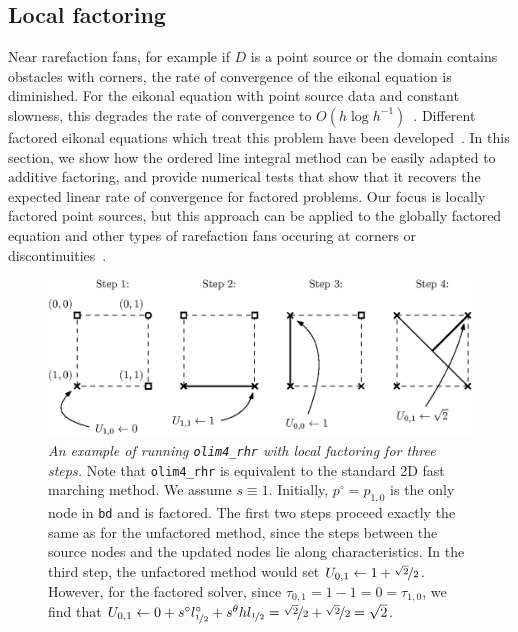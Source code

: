 \documentclass[smallcondensed]{svjour3}
\begin{document}
\subsection{Local factoring}

Near rarefaction fans, for example if $D$ is a point source or the
domain contains obstacles with corners, the rate of convergence of the
eikonal equation is diminished. For the eikonal equation with point
source data and constant slowness, this degrades the rate of
convergence to $O(h \log
h^{-1})$~\cite{qi2018corner,zhao2005fast}. Different factored eikonal
equations which treat this problem have been
developed~\cite{fomel2009fast,luo2012fast}. In this section, we show
how the ordered line integral method can be easily adapted to additive
factoring, and provide numerical tests that show that it recovers the
expected linear rate of convergence for factored problems. Our focus
is locally factored point sources, but this approach can be applied to
the globally factored equation and other types of rarefaction fans
occuring at corners or discontinuities~\cite{qi2018corner}.

\begin{figure}
  \centering
  \includegraphics[width=\linewidth]{factoring-example.eps}
  \caption{\emph{An example of running \texttt{olim4\_rhr} with local
      factoring for three steps.} Note that \texttt{olim4\_rhr} is
    equivalent to the standard 2D fast marching method. We assume
    $s \equiv 1$. Initially, $p^\circ = p_{1, 0}$ is the only node in
    \texttt{bd} and is factored. The first two steps proceed exactly
    the same as for the unfactored method, since the steps between the
    source nodes and the updated nodes lie along characteristics. In
    the third step, the unfactored method would set
    $U_{0,1} \gets 1 + \nicefrac{\sqrt{2}}{2}$. However, for the
    factored solver, since $\tau_{0,1} = 1 - 1 = 0 = \tau_{1,0}$, we
    find that
    $U_{0,1} \gets 0 + s^\circ l^\circ_{\nicefrac{1}{2}} + s^\theta h
    l_{\nicefrac{1}{2}} = \nicefrac{\sqrt{2}}{2} +
    \nicefrac{\sqrt{2}}{2} = \sqrt{2}$.}\label{fig:factoring-example}
\end{figure}
\end{document}
